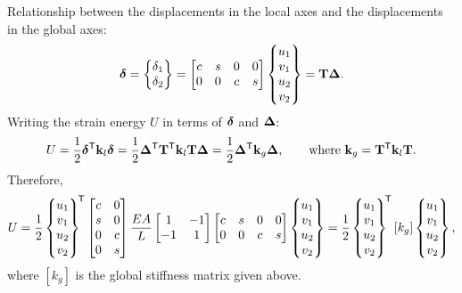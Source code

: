 Relationship between the displacements in the local axes and the displacements in the global axes:
\begin{equation}
  \bm{\delta} = \begin{Bmatrix}\delta_1\\ \delta_2\end{Bmatrix} = \begin{bmatrix}c & s & 0 & 0\\ 0 & 0 & c & s\end{bmatrix}\begin{Bmatrix}u_1\\ v_1\\ u_2\\ v_2\end{Bmatrix} = \mathbf{T}\bm{\Delta}.
\end{equation}
Writing the strain energy $U$ in terms of $\bm{\delta}$ and $\bm{\Delta}$:
\begin{equation}
  U = \frac12\bm{\delta}^{\mathsf{T}}\mathbf{k}_l\bm{\delta} = \frac12\bm{\Delta}^{\mathsf{T}}\mathbf{T}^{\mathsf{T}}\mathbf{k}_l\mathbf{T}\bm{\Delta}
    = \frac12\bm{\Delta}^{\mathsf{T}}\mathbf{k}_g\bm{\Delta},
  \qquad\text{where } \mathbf{k}_g = \mathbf{T}^{\mathsf{T}}\mathbf{k}_l\mathbf{T}.
\end{equation}
Therefore,
\begin{equation}
  U = \frac12\begin{Bmatrix}u_1\\ v_1\\ u_2\\ v_2\end{Bmatrix}^{\!\mathsf{T}}
  \begin{bmatrix}c & 0\\ s & 0\\ 0 & c\\ 0 & s\end{bmatrix}\frac{EA}{L}\begin{bmatrix}1 & -1\\ -1 & 1\end{bmatrix}\begin{bmatrix}c & s & 0 & 0\\ 0 & 0 & c & s\end{bmatrix}
  \begin{Bmatrix}u_1\\ v_1\\ u_2\\ v_2\end{Bmatrix}
  = \frac12\begin{Bmatrix}u_1\\ v_1\\ u_2\\ v_2\end{Bmatrix}^{\!\mathsf{T}}[k_g]\begin{Bmatrix}u_1\\ v_1\\ u_2\\ v_2\end{Bmatrix},
\end{equation}
where $[k_g]$ is the global stiffness matrix given above.

